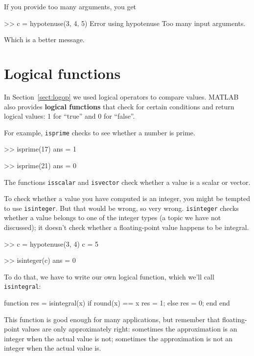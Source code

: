 \documentclass[
]{book}
\numberwithin{Answer}{chapter}
\numberwithin{Exercise}{chapter}
\begin{document}
If you provide too many arguments, you get

\begin{code}
>> c = hypotenuse(3, 4, 5)
Error using hypotenuse
Too many input arguments.
\end{code}

Which is a better message.


\section{Logical functions}

In Section~\ref{sect:logop} we used logical operators to compare values.
MATLAB also provides {\bf logical functions} that check for certain
conditions and return logical values: 1 for ``true'' and 0 for ``false''.

For example, {\tt isprime} checks to see whether a number is prime.

\begin{code}
>> isprime(17)
ans = 1

>> isprime(21)
ans = 0
\end{code}

The functions {\tt isscalar} and {\tt isvector} check whether
a value is a scalar or vector.

To check whether a value you have computed is an integer, you might
be tempted to use {\tt isinteger}.  But that would be wrong, so very
wrong.  {\tt isinteger} checks whether a value belongs to one of
the integer types (a topic we have not discussed); it doesn't check
whether a floating-point value happens to be integral.

\begin{code}
>> c = hypotenuse(3, 4)
c = 5

>> isinteger(c)
ans = 0
\end{code}

To do that, we have to write our own logical function, which
we'll call {\tt isintegral}:

\begin{code}
function res = isintegral(x)
    if round(x) == x
        res = 1;       %
    else
        res = 0;       %
    end
end
\end{code}

This function is good enough for many applications, but remember
that floating-point values are only approximately right:
sometimes the approximation is an integer when the actual value is not; 
sometimes the approximation is not an integer when the actual value is.
\end{document}
